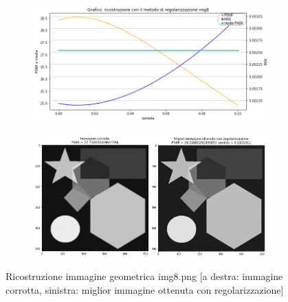 \begin{figure}[H]
    \centering
    \begin{subfigure}{0.5\textwidth}
        \includegraphics[width=\textwidth]{imgRicostruzione/grafico8minimize.png}
    \end{subfigure}%
    \begin{subfigure}{0.5\textwidth}
        \centering
        \includegraphics[width=\textwidth]{imgRicostruzione/ricostruzione8minimize.png}
    \end{subfigure}
    \caption{Ricostruzione immagine geometrica img8.png [a destra: immagine corrotta, sinistra: miglior immagine ottenuta con regolarizzazione]}
\end{figure}

